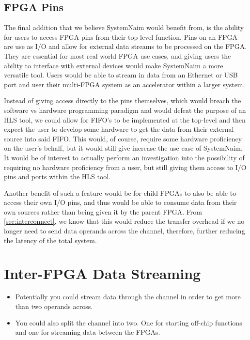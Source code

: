\subsection{FPGA Pins}

The final addition that we believe SystemNaim would benefit from, is the ability for users to access FPGA pins from their top-level function. Pins on an FPGA are use as I/O and allow for external data streams to be processed on the FPGA. They are essential for most real world FPGA use cases, and giving users the ability to interface with external devices would make SystemNaim a more versatile tool. Users would be able to stream in data from an Ethernet or USB port and user their multi-FPGA system as an accelerator within a larger system. 

Instead of giving access directly to the pins themselves, which would breach the software vs hardware programming paradigm and would defeat the purpose of an HLS tool, we could allow for FIFO's to be implemented at the top-level and then expect the user to develop some hardware to get the data from their external source into said FIFO. This would, of course, require some hardware proficiency on the user's behalf, but it would still give increase the use case of SystemNaim. It would be of interest to actually perform an investigation into the possibility of requiring no hardware proficiency from a user, but still giving them access to I/O pins and ports within the HLS tool.

Another benefit of such a feature would be for child FPGAs to also be able to access their own I/O pins, and thus would be able to consume data from their own sources rather than being given it by the parent FPGA. From \autoref{sec:interconnect}, we know that this would reduce the transfer overhead if we no longer need to send data operands across the channel, therefore, further reducing the latency of the total system.

\section{Inter-FPGA Data Streaming}

\begin{itemize}
    \item Potentially you could stream data through the channel in order to get more than two operands across.
    \item You could also split the channel into two. One for starting off-chip functions and one for streaming data between the FPGAs.
\end{itemize}

